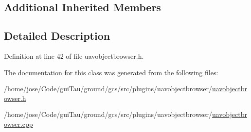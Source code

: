 \subsection*{Additional Inherited Members}


\subsection{Detailed Description}


Definition at line 42 of file uavobjectbrowser.\-h.



The documentation for this class was generated from the following files\-:\begin{DoxyCompactItemize}
\item 
/home/jose/\-Code/gui\-Tau/ground/gcs/src/plugins/uavobjectbrowser/\hyperlink{uavobjectbrowser_8h}{uavobjectbrowser.\-h}\item 
/home/jose/\-Code/gui\-Tau/ground/gcs/src/plugins/uavobjectbrowser/\hyperlink{uavobjectbrowser_8cpp}{uavobjectbrowser.\-cpp}\end{DoxyCompactItemize}
